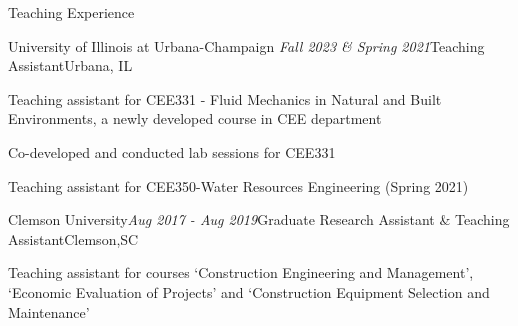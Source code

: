 \documentclass{resume} %
\begin{document}
\begin{rSection}{Teaching Experience}
\begin{rSubsection}{University of Illinois at Urbana-Champaign} {\em Fall 2023 \& Spring 2021}{Teaching Assistant}{Urbana, IL}
\item Teaching assistant for CEE331 - Fluid Mechanics in Natural and Built Environments, a newly developed course in CEE department
\item Co-developed and conducted lab sessions for CEE331
\item Teaching assistant for CEE350-Water Resources Engineering (Spring 2021)
\end{rSubsection}

\begin{rSubsection}{Clemson University}{\em Aug 2017 - Aug 2019}{Graduate Research Assistant \& Teaching Assistant}{Clemson,SC}
\item Teaching assistant for courses `Construction Engineering and Management', `Economic Evaluation of Projects' and `Construction Equipment Selection and Maintenance' 
\end{rSubsection}




\end{rSection}
\end{document}
